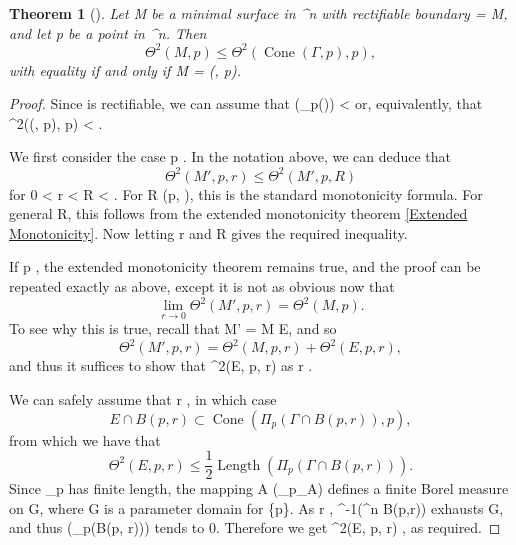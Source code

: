 \documentclass[a4paper, 11pt]{article}
\theoremstyle{plain}
\newtheorem{theorem}{Theorem}[section]
\theoremstyle{definition}
\theoremstyle{remark}
\numberwithin{equation}{subsection}
\def\({}
\def\){}
\def\pi{}
\begin{document}
\begin{theorem}[{\cite[Theorem 1.3]{EWW02}}]
\label{Interior_regularity_basic_estimate}
Let \(M\) be a minimal surface in \(^{n}\) with rectifiable boundary \(\Gamma = \partial M\), and let \(p\) be a point in \(^{n}\). Then
\begin{equation}
\Theta^{2}(M,p) \leqslant \Theta^{2}(\operatorname{Cone}(\Gamma, p), p),
\end{equation}
with equality if and only if \(M = (\Gamma, p)\).
\end{theorem}


\begin{proof}
Since \(\Gamma\) is rectifiable, we can assume that \((\Pi_{p}(\Gamma)) < \infty\) or, equivalently, that \(\Theta^{2}((\Gamma, p), p) < \infty\). 

We first consider the case \(p \notin \Gamma\). In the notation above, we can deduce that
\begin{equation}
\Theta^{2}(M', p, r) \leqslant \Theta^{2}(M', p, R)
\end{equation}
for \(0 < r < R < \infty\). For \(R \leqslant {}(p, \Gamma)\), this is the standard monotonicity formula. For general \(R\), this follows from the extended monotonicity theorem \ref{Extended Monotonicity}. Now letting \(r \) and \(R \rightarrow \infty\) gives the required inequality.

If \(p \in \Gamma\), the extended monotonicity theorem remains true, and the proof can be repeated exactly as above, except it is not as obvious now that
\begin{equation}
\lim_{r \rightarrow 0} \Theta^{2}(M', p, r) = \Theta^{2}(M, p).
\end{equation}
To see why this is true, recall that \(M' = M \cup E\), and so
\begin{equation}
\Theta^{2}(M', p, r) = \Theta^{2}(M, p, r) + \Theta^{2}(E, p, r),
\end{equation}
and thus it suffices to show that \(\Theta^{2}(E, p, r) \) as \(r \).

We can safely assume that \(r \), in which case
\begin{equation}
E \cap B(p, r) \subset \operatorname{Cone}(\Pi_{p}(\Gamma \cap B(p, r)), p),
\end{equation}
from which we have that
\begin{equation}
\Theta^{2}(E, p, r) \leqslant \frac{1}{2\pi}\operatorname{Length}(\Pi_{p}(\Gamma \cap B(p, r))).
\end{equation}
Since \(\Pi_{p}\Gamma\) has finite length, the mapping \(A \mapsto {}(\Pi_{p}\Gamma \vert_{A})\) defines a finite Borel measure on \(G\), where \(G\) is a parameter domain for \(\Gamma \setminus \{p\}\). As \(r \), \(\Gamma^{-1}(^{n} \setminus B(p,r))\) exhausts \(G\), and thus \((\Pi_{p}(\Gamma \cap B(p, r)))\) tends to \(0\). Therefore we get \(\Theta^{2}(E, p, r) \), as required.
\end{proof}
\end{document}
